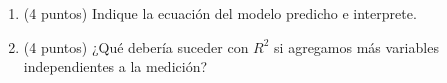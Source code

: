\documentclass[10pt,a4paper]{article}
\begin{document}
\begin{enumerate}
\begin{enumerate}
        \item (4 puntos) Indique la ecuación del modelo predicho e interprete.

        \item (4 puntos) ¿Qué debería suceder con $R^2$ si agregamos más variables independientes a la medición?
        
    \end{enumerate}

\end{enumerate}
\end{document}
